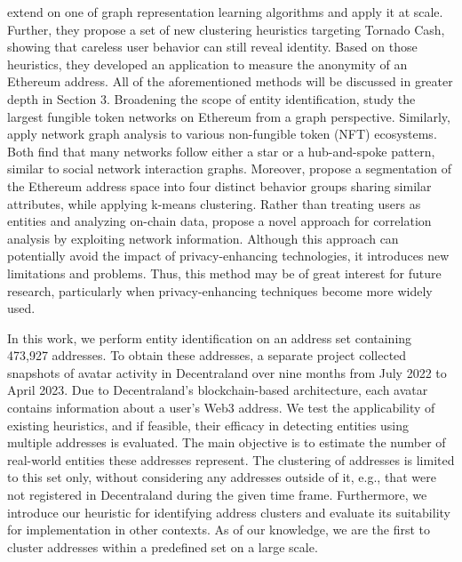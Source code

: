 \documentclass[12pt,a4paper,titlepage,oneside,english]{article}
\begin{document}
\cite{wu2022tutela} extend on one of \cite{Beres2020} graph representation learning algorithms and apply it at scale. Further, they propose a set of new clustering heuristics targeting Tornado Cash,  showing that careless user behavior can still reveal identity. Based on those heuristics, they developed an application to measure the anonymity of an Ethereum address. All of the aforementioned methods will be discussed in greater depth in Section 3. \newline
Broadening the scope of entity identification, \cite{victorlüders2019} study the largest fungible token networks on Ethereum from a graph perspective. Similarly, \cite{casalebrunet2021} apply network graph analysis to various non-fungible token (NFT) ecosystems. Both find that many networks follow either a star or a hub-and-spoke pattern, similar to social network interaction graphs. Moreover, \cite{Payette2017} propose a segmentation of the Ethereum address space into four distinct behavior groups sharing similar attributes, while applying k-means clustering. \newline
Rather than treating users as entities and analyzing on-chain data, \cite{yu2023} propose a novel approach for correlation analysis by exploiting network information. Although this approach can potentially avoid the impact of privacy-enhancing technologies, it introduces new limitations and problems. Thus, this method may be of great interest for future research, particularly when privacy-enhancing techniques become more widely used.

In this work, we perform entity identification on an address set containing 473,927 addresses. To obtain these addresses, a separate project collected snapshots of avatar activity in Decentraland over nine months from July 2022 to April 2023. Due to Decentraland's blockchain-based architecture, each avatar contains information about a user's Web3 address. \newline
We test the applicability of existing heuristics, and if feasible, their efficacy in detecting entities using multiple addresses is evaluated.
The main objective is to estimate the number of real-world entities these addresses represent. The clustering of addresses is limited to this set only, without considering any addresses outside of it, e.g., that were not registered in Decentraland during the given time frame. Furthermore, we introduce our heuristic for identifying address clusters and evaluate its suitability for implementation in other contexts. As of our knowledge, we are the first to cluster addresses within a predefined set on a large scale.
\end{document}

